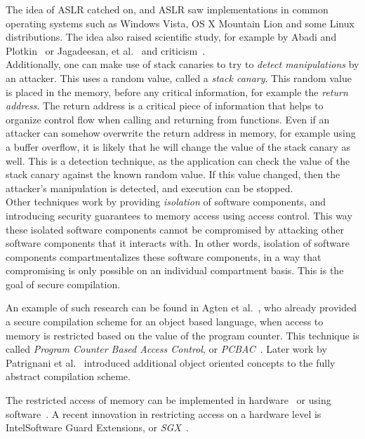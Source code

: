 The idea of ASLR catched on, and ASLR saw implementations in common operating systems such as Windows Vista, OS X Mountain Lion and some Linux distributions. 
The idea also raised scientific study, for example by Abadi and Plotkin~\cite{AbadiASLR} or Jagadeesan, et al.~\cite{Jagadeesan} and criticism~\cite{Shacham:2004:EAR:1030083.1030124,Strackx:2009:BMS:1519144.1519145}.
\\
Additionally, one can make use of stack canaries to try to \emph{detect manipulations} by an attacker. 
This uses a random value, called a \emph{stack canary}. 
This random value is placed in the memory, before any critical information, for example the \emph{return address}.
The return address is a critical piece of information that helps to organize control flow when calling and returning from functions.
Even if an attacker can somehow overwrite the return address in memory, for example using a buffer overflow\cite{OVSPaper}, it is likely that he will change the value of the stack canary as well.
This is a detection technique, as the application can check the value of the stack canary against the known random value.
If this value changed, then the attacker's manipulation is detected, and execution can be stopped.
\\[1em]
Other techniques work by providing \emph{isolation} of software components, and introducing security guarantees to memory access using access control.
This way these isolated software components cannot be compromised by attacking other software components that it interacts with.
In other words, isolation of software components compartmentalizes these software components, in a way that compromising is only possible on an individual compartment basis.
This is the goal of secure compilation.

An example of such research can be found in Agten et al.~\cite{Agten:2012:SCM:2354412.2355247}, who already provided a secure compilation scheme for an object based language, when access to memory is restricted based on the value of the program counter. This technique is called \emph{Program Counter Based Access Control}, or \emph{PCBAC}~\cite{PCBAC}.
Later work by Patrignani et al.~\cite{Patrignani} introduced additional object oriented concepts to the fully abstract compilation scheme.

The restricted access of memory can be implemented in hardware~\cite{Sancus,SGX} or using software~\cite{Fides,Salus}.
A recent innovation in restricting access on a hardware level is Intel\textregistered Software Guard Extensions, or \emph{SGX}~\cite{SGX}.

